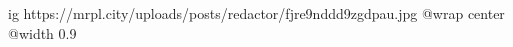  
 
 
 
 

\ifcmt
  ig https://mrpl.city/uploads/posts/redactor/fjre9nddd9zgdpau.jpg
  @wrap center
  @width 0.9
\fi
